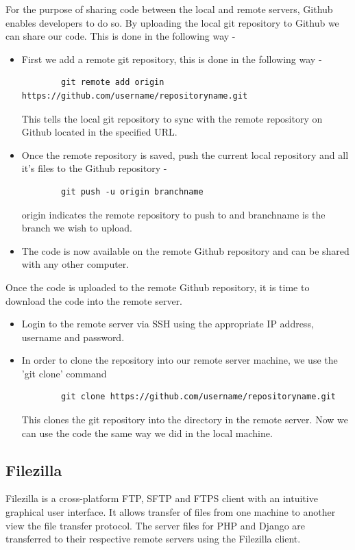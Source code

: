 \documentclass[../thesis.tex]{subfiles}
\begin{document}
	For the purpose of sharing code between the local and remote servers, Github enables developers to do so. By uploading the local git repository to Github we can share our code. This is done in the following way -
	\begin{itemize}
		\item First we add a remote git repository, this is done in the following way - 
		\begin{verbatim}
		git remote add origin https://github.com/username/repositoryname.git
		\end{verbatim}
		This tells the local git repository to sync with the remote repository on Github located in the specified URL.
		\smallskip
		\item Once the remote repository is saved, push the current local repository and all it's files to the Github repository -
		\begin{verbatim}
		git push -u origin branchname
		\end{verbatim}
		origin indicates the remote repository to push to and branchname is the branch we wish to upload.
		\smallskip
		\item The code is now available on the remote Github repository and can be shared with any other computer.
	\end{itemize}
	Once the code is uploaded to the remote Github repository, it is time to download the code into the remote server.
	\begin{itemize}
		\item Login to the remote server via SSH using the appropriate IP address, username and password.
		\smallskip
		\item In order to clone the repository into our remote server machine, we use the 'git clone' command
		\begin{verbatim}
		git clone https://github.com/username/repositoryname.git
		\end{verbatim}
		This clones the git repository into the directory in the remote server. Now we can use the code the same way we did in the local machine.
	\end{itemize}
	\subsection*{Filezilla}
	Filezilla is a cross-platform FTP, SFTP and FTPS client with an intuitive graphical user interface. It allows transfer of files from one machine to another view the file transfer protocol. The server files for PHP and Django are transferred to their respective remote servers using the Filezilla client.
	\newline
	
\end{document}
